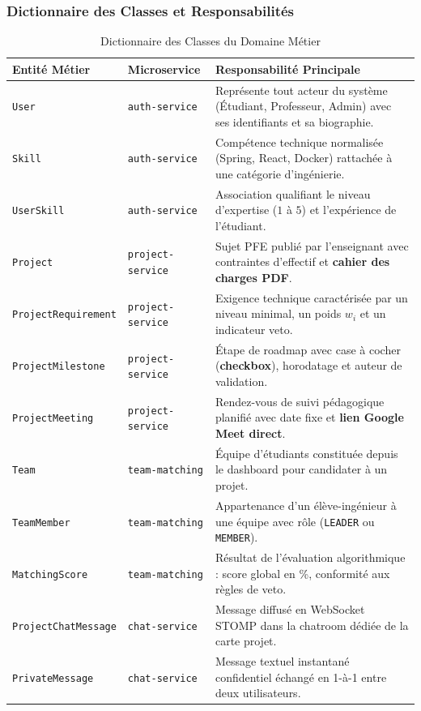 \documentclass[11pt,a4paper,titlepage]{article}
\begin{document}
\newpage
\subsubsection{Dictionnaire des Classes et Responsabilités}

\begin{table}[htbp]
\centering
\small
\caption{Dictionnaire des Classes du Domaine Métier}
\label{tab:classes_dict}
\begin{tabularx}{\textwidth}{l l p{8.5cm}}
\toprule
\textbf{Entité Métier} & \textbf{Microservice} & \textbf{Responsabilité Principale} \\
\midrule
\texttt{User} & \texttt{auth-service} & Représente tout acteur du système (Étudiant, Professeur, Admin) avec ses identifiants et sa biographie. \\
\addlinespace
\texttt{Skill} & \texttt{auth-service} & Compétence technique normalisée (Spring, React, Docker) rattachée à une catégorie d'ingénierie. \\
\addlinespace
\texttt{UserSkill} & \texttt{auth-service} & Association qualifiant le niveau d'expertise ($1$ à $5$) et l'expérience de l'étudiant. \\
\addlinespace
\texttt{Project} & \texttt{project-service} & Sujet PFE publié par l'enseignant avec contraintes d'effectif et \textbf{cahier des charges PDF}. \\
\addlinespace
\texttt{ProjectRequirement} & \texttt{project-service} & Exigence technique caractérisée par un niveau minimal, un poids $w_i$ et un indicateur veto. \\
\addlinespace
\texttt{ProjectMilestone} & \texttt{project-service} & Étape de roadmap avec case à cocher (\textbf{checkbox}), horodatage et auteur de validation. \\
\addlinespace
\texttt{ProjectMeeting} & \texttt{project-service} & Rendez-vous de suivi pédagogique planifié avec date fixe et \textbf{lien Google Meet direct}. \\
\addlinespace
\texttt{Team} & \texttt{team-matching} & Équipe d'étudiants constituée depuis le dashboard pour candidater à un projet. \\
\addlinespace
\texttt{TeamMember} & \texttt{team-matching} & Appartenance d'un élève-ingénieur à une équipe avec rôle (\texttt{LEADER} ou \texttt{MEMBER}). \\
\addlinespace
\texttt{MatchingScore} & \texttt{team-matching} & Résultat de l'évaluation algorithmique : score global en \%, conformité aux règles de veto. \\
\addlinespace
\texttt{ProjectChatMessage} & \texttt{chat-service} & Message diffusé en WebSocket STOMP dans la chatroom dédiée de la carte projet. \\
\addlinespace
\texttt{PrivateMessage} & \texttt{chat-service} & Message textuel instantané confidentiel échangé en 1-à-1 entre deux utilisateurs. \\
\bottomrule
\end{tabularx}
\end{table}
\end{document}

